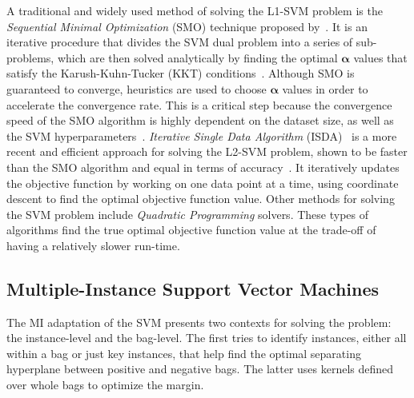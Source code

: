 \documentclass[preprint,12pt]{elsarticle}
\begin{document}
A traditional and widely used method of solving the L1-SVM problem is the \textit{Sequential Minimal Optimization} (SMO) technique proposed by~\citet{Platt1998}. It is an iterative procedure that divides the SVM dual problem into a series of sub-problems, which are then solved analytically by finding the optimal $\bm \alpha$ values that satisfy the Karush-Kuhn-Tucker (KKT) conditions~\citep{Boyd2004}. Although SMO is guaranteed to converge, heuristics are used to choose $\bm \alpha$ values in order to accelerate the convergence rate. This is a critical step because the convergence speed of the SMO algorithm is highly dependent on the dataset size, as well as the SVM hyperparameters~\citep{Schoelkopf2002}. \textit{Iterative Single Data Algorithm} (ISDA)~\citep{Huang2006,Kecman2016} is a more recent and efficient approach for solving the L2-SVM problem, shown to be faster than the SMO algorithm and equal in terms of accuracy~\citep{Kecman2015,Kecman2014}. It iteratively updates the objective function by working on one data point at a time, using coordinate descent to find the optimal objective function value. Other methods for solving the SVM problem include \textit{Quadratic Programming} solvers. These types of algorithms find the true optimal objective function value at the trade-off of having a relatively slower run-time.

\subsection{Multiple-Instance Support Vector Machines}
The MI adaptation of the SVM presents two contexts for solving the problem: the instance-level and the bag-level. The first tries to identify instances, either all within a bag or just key instances, that help find the optimal separating hyperplane between positive and negative bags. The latter uses kernels defined over whole bags to optimize the margin. 
\end{document}
